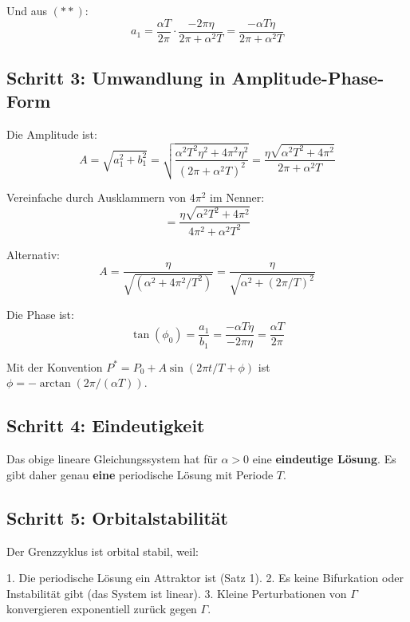 \documentclass[a4paper, 12pt, twoside, openright]{report}
\theoremstyle{definition}
\theoremstyle{definition}
\begin{document}
Und aus $(**)$:
\begin{equation}
    a_1 = \frac{\alpha T}{2\pi} \cdot \frac{-2\pi \eta}{2\pi + \alpha^2 T} = \frac{-\alpha T \eta}{2\pi + \alpha^2 T}
\end{equation}

\subsection{Schritt 3: Umwandlung in Amplitude-Phase-Form}

Die Amplitude ist:
\begin{equation}
    A = \sqrt{a_1^2 + b_1^2} = \sqrt{\frac{\alpha^2 T^2 \eta^2 + 4\pi^2 \eta^2}{(2\pi + \alpha^2 T)^2}} = \frac{\eta\sqrt{\alpha^2 T^2 + 4\pi^2}}{2\pi + \alpha^2 T}
\end{equation}

Vereinfache durch Ausklammern von $4\pi^2$ im Nenner:
\begin{equation}
    = \frac{\eta \sqrt{\alpha^2 T^2 + 4\pi^2}}{4\pi^2 + \alpha^2 T^2}
\end{equation}

Alternativ:
\begin{equation}
    A = \frac{\eta}{\sqrt{(\alpha^2 + 4\pi^2/T^2)}} = \frac{\eta}{\sqrt{\alpha^2 + (2\pi/T)^2}}
\end{equation}

Die Phase ist:
\begin{equation}
    \tan(\phi_0) = \frac{a_1}{b_1} = \frac{-\alpha T \eta}{-2\pi \eta} = \frac{\alpha T}{2\pi}
\end{equation}

Mit der Konvention $P^* = P_0 + A\sin(2\pi t/T + \phi)$ ist $\phi = -\arctan(2\pi/(\alpha T))$.

\subsection{Schritt 4: Eindeutigkeit}

Das obige lineare Gleichungssystem hat für $\alpha > 0$ eine \textbf{eindeutige Lösung}. Es gibt daher genau \textbf{eine} periodische Lösung mit Periode $T$.

\subsection{Schritt 5: Orbitalstabilität}

Der Grenzzyklus ist orbital stabil, weil:

1. Die periodische Lösung ein Attraktor ist (Satz 1).
2. Es keine Bifurkation oder Instabilität gibt (das System ist linear).
3. Kleine Perturbationen von $\Gamma$ konvergieren exponentiell zurück gegen $\Gamma$.
\end{document}
